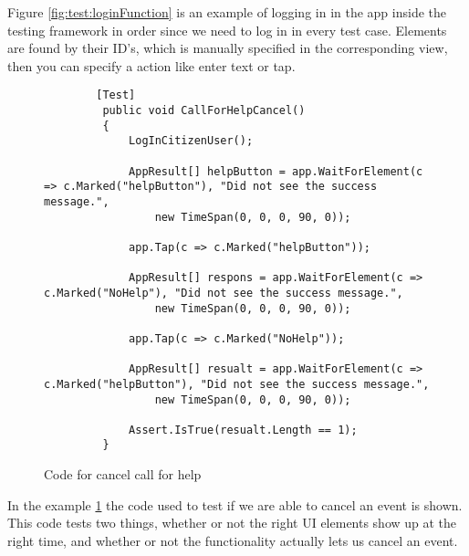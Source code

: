 Figure \ref{fig:test:loginFunction} is an example of logging in in the app inside the testing framework in order since we need to log in in every test case. Elements are found by their ID's, which is manually specified in the corresponding view, then you can specify a action like enter text or tap.

\begin{figure}[H]
    \centering
    \begin{lstlisting}
        [Test]
         public void CallForHelpCancel()
         {
             LogInCitizenUser();
 
             AppResult[] helpButton = app.WaitForElement(c => c.Marked("helpButton"), "Did not see the success message.",
                 new TimeSpan(0, 0, 0, 90, 0));
 
             app.Tap(c => c.Marked("helpButton"));
 
             AppResult[] respons = app.WaitForElement(c => c.Marked("NoHelp"), "Did not see the success message.",
                 new TimeSpan(0, 0, 0, 90, 0));
 
             app.Tap(c => c.Marked("NoHelp"));
 
             AppResult[] resualt = app.WaitForElement(c => c.Marked("helpButton"), "Did not see the success message.",
                 new TimeSpan(0, 0, 0, 90, 0));
 
             Assert.IsTrue(resualt.Length == 1);
         }
    \end{lstlisting}
    \caption{Code for cancel call for help}
    \label{fig:test:cancelHelp}
\end{figure}
In the example \ref{fig:test:cancelHelp} the code used to test if we are able to cancel an event is shown. This code tests two things, whether or not the right UI elements show up at the right time, and whether or not the functionality actually lets us cancel an event.
